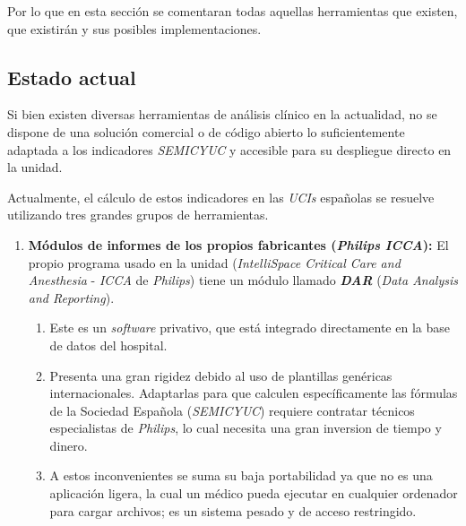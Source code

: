 Por lo que en esta sección se comentaran todas aquellas herramientas que existen, que existirán y sus posibles implementaciones.
\subsection{Estado actual}
Si bien existen diversas herramientas de análisis clínico en la actualidad, no se dispone de una solución comercial o de código abierto lo suficientemente adaptada a los indicadores \textit{SEMICYUC} y accesible para su despliegue directo en la unidad.

Actualmente, el cálculo de estos indicadores en las \textit{UCIs} españolas se resuelve utilizando tres grandes grupos de herramientas.

\begin{enumerate}
    \item \textbf{Módulos de informes de los propios fabricantes (\textit{Philips ICCA}):} El propio programa usado en la unidad (\textit{IntelliSpace Critical Care and Anesthesia} - \textit{ICCA} de \textit{Philips}) tiene un módulo llamado \textbf{\textit{DAR}} (\textit{Data Analysis and Reporting}).
    \begin{enumerate}
        \item Este es un \textit{software} privativo, que está integrado directamente en la base de datos del hospital.
        \item Presenta una gran rigidez debido al uso de plantillas genéricas internacionales. Adaptarlas para que calculen específicamente las fórmulas de la Sociedad Española (\textit{SEMICYUC}) requiere contratar técnicos especialistas de \textit{Philips}, lo cual necesita una gran inversion de tiempo y dinero.\cite{M_I_V_E_2023}
        \item A estos inconvenientes se suma su baja portabilidad ya que no es una aplicación ligera, la cual un médico pueda ejecutar en cualquier ordenador para cargar archivos; es un sistema pesado y de acceso restringido.
    \end{enumerate}


\end{enumerate}
